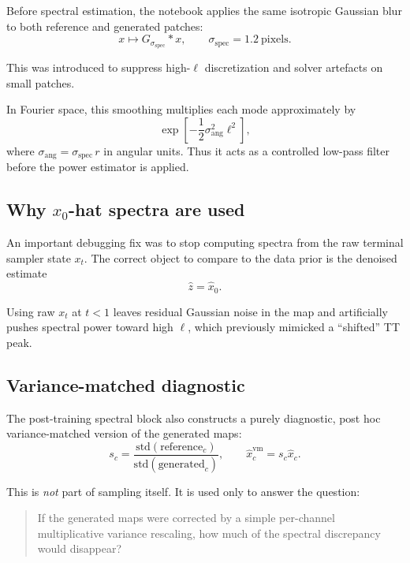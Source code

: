 \documentclass[11pt]{article}
\begin{document}
Before spectral estimation, the notebook applies the same isotropic Gaussian blur to both reference and generated patches:
\begin{equation}
  x \mapsto G_{\sigma_{\mathrm{spec}}} * x,
  \qquad
  \sigma_{\mathrm{spec}} = 1.2\ \text{pixels}.
\end{equation}

This was introduced to suppress high-\(\ell\) discretization and solver artefacts on small patches.

In Fourier space, this smoothing multiplies each mode approximately by
\begin{equation}
  \exp\!\left[-\frac12 \sigma_{\mathrm{ang}}^2 \ell^2\right],
\end{equation}
where \(\sigma_{\mathrm{ang}} = \sigma_{\mathrm{spec}}\,r\) in angular units. Thus it acts as a controlled low-pass filter before the power estimator is applied.

\subsection{Why \(x_0\)-hat spectra are used}

An important debugging fix was to stop computing spectra from the raw terminal sampler state \(x_t\). The correct object to compare to the data prior is the denoised estimate
\begin{equation}
  \hat z = \hat x_0.
\end{equation}

Using raw \(x_t\) at \(t<1\) leaves residual Gaussian noise in the map and artificially pushes spectral power toward high \(\ell\), which previously mimicked a ``shifted'' TT peak.

\subsection{Variance-matched diagnostic}

The post-training spectral block also constructs a purely diagnostic, post hoc variance-matched version of the generated maps:
\begin{equation}
  s_c
  =
  \frac{\mathrm{std}(\text{reference}_c)}
       {\mathrm{std}(\text{generated}_c)},
  \qquad
  \hat x_c^{\mathrm{vm}} = s_c \hat x_c.
\end{equation}

This is \emph{not} part of sampling itself. It is used only to answer the question:
\begin{quote}
If the generated maps were corrected by a simple per-channel multiplicative variance rescaling, how much of the spectral discrepancy would disappear?
\end{quote}
\end{document}
